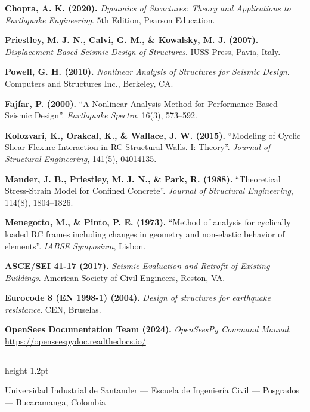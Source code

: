 \documentclass[11pt,letterpaper]{article}
\begin{document}
\begingroup
\footnotesize
\begin{enumerate}[leftmargin=16pt, topsep=1pt, itemsep=0.8pt, parsep=0pt, label={[\arabic*]}]
    \item \textbf{Chopra, A. K. (2020).} \textit{Dynamics of Structures: Theory and Applications to Earthquake Engineering}. 5th Edition, Pearson Education.
    \item \textbf{Priestley, M. J. N., Calvi, G. M., \& Kowalsky, M. J. (2007).} \textit{Displacement-Based Seismic Design of Structures}. IUSS Press, Pavia, Italy.
    \item \textbf{Powell, G. H. (2010).} \textit{Nonlinear Analysis of Structures for Seismic Design}. Computers and Structures Inc., Berkeley, CA.
    \item \textbf{Fajfar, P. (2000).} ``A Nonlinear Analysis Method for Performance-Based Seismic Design''. \textit{Earthquake Spectra}, 16(3), 573--592.
    \item \textbf{Kolozvari, K., Orakcal, K., \& Wallace, J. W. (2015).} ``Modeling of Cyclic Shear-Flexure Interaction in RC Structural Walls. I: Theory''. \textit{Journal of Structural Engineering}, 141(5), 04014135.
    \item \textbf{Mander, J. B., Priestley, M. J. N., \& Park, R. (1988).} ``Theoretical Stress-Strain Model for Confined Concrete''. \textit{Journal of Structural Engineering}, 114(8), 1804--1826.
    \item \textbf{Menegotto, M., \& Pinto, P. E. (1973).} ``Method of analysis for cyclically loaded RC frames including changes in geometry and non-elastic behavior of elements''. \textit{IABSE Symposium}, Lisbon.
    \item \textbf{ASCE/SEI 41-17 (2017).} \textit{Seismic Evaluation and Retrofit of Existing Buildings}. American Society of Civil Engineers, Reston, VA.
    \item \textbf{Eurocode 8 (EN 1998-1) (2004).} \textit{Design of structures for earthquake resistance}. CEN, Bruselas.
    \item \textbf{OpenSees Documentation Team (2024).} \textit{OpenSeesPy Command Manual}. \url{https://openseespydoc.readthedocs.io/}
\end{enumerate}
\endgroup

\vspace{0.20cm}
\begin{center}
    {\color{uispurple}\hrule height 1.2pt}\vspace{0.08cm}
    {\footnotesize\color{uisgray} Universidad Industrial de Santander --- Escuela de Ingeniería Civil --- Posgrados --- Bucaramanga, Colombia}
\end{center}
\end{document}
